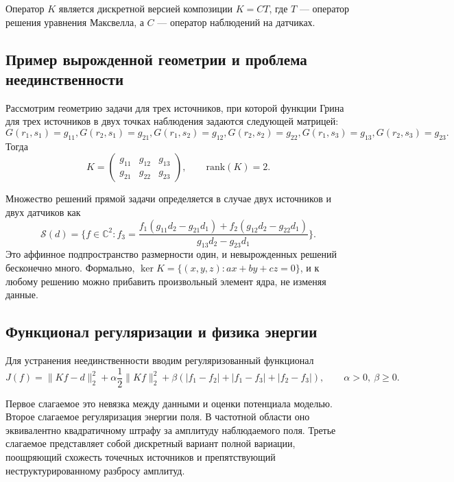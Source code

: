 \documentclass[a4paper,14pt,oneside,openany]{extarticle}
\begin{document}
Оператор $K$ является дискретной версией композиции $K=C T$, где $T$ — оператор решения уравнения Максвелла, 
а $C$ — оператор наблюдений на датчиках.

\subsection{Пример вырожденной геометрии и проблема неединственности}

Рассмотрим геометрию задачи для трех источников, 
при которой функции Грина для трех источников в двух точках наблюдения задаются следующей матрицей:
\begin{equation}\label{eq:degenerate_G}
    G(r_1,s_1)=g_{11}, G(r_2,s_1)=g_{21},
    G(r_1,s_2)=g_{12}, G(r_2,s_2)=g_{22},
    G(r_1,s_3)=g_{13}, G(r_2,s_3)=g_{23}.
\end{equation}
Тогда
\begin{equation}\label{eq:K_rank1}
    K=\begin{pmatrix}g_{11} & g_{12} & g_{13}\\ g_{21} & g_{22} & g_{23}\end{pmatrix},
    \qquad \mathrm{rank}(K)=2.
\end{equation}

Множество решений прямой задачи определяется в случае двух источников и двух датчиков как
\begin{equation}\label{eq:data_line}
    \mathcal{S}(d)=\{f\in\mathbb{C}^2: f_3 = \frac{f_1(g_{11}d_2 - g_{21}d_1) + f_2(g_{12}d_2-g_{22}d_1)}{g_{13}d_2-g_{23}d_1}\}.
\end{equation}
Это аффинное подпространство размерности один, и невырожденных решений бесконечно много. 
Формально, $\ker K=\{(x,y,z): a x+b y+c z=0\}$, и к любому решению можно прибавить произвольный элемент ядра, не изменяя данные.

\subsection{Функционал регуляризации и физика энергии}

Для устранения неединственности вводим регуляризованный функционал
\begin{equation}\label{eq:functional_basic}
    J(f)=\|K f-d\|_2^2 + \alpha \frac12 \|K f\|_2^2 + \beta (|f_1-f_2| + |f_1-f_3| + |f_2-f_3|),
    \qquad \alpha>0,\ \beta\ge0.
\end{equation}

Первое слагаемое это невязка между данными и оценки потенциала моделью. Второе слагаемое регуляризация энергии поля.
В частотной области оно эквивалентно квадратичному штрафу за амплитуду наблюдаемого поля. 
Третье слагаемое представляет собой дискретный вариант полной вариации,
поощряющий схожесть точечных источников и препятствующий неструктурированному разбросу амплитуд.
\end{document}
